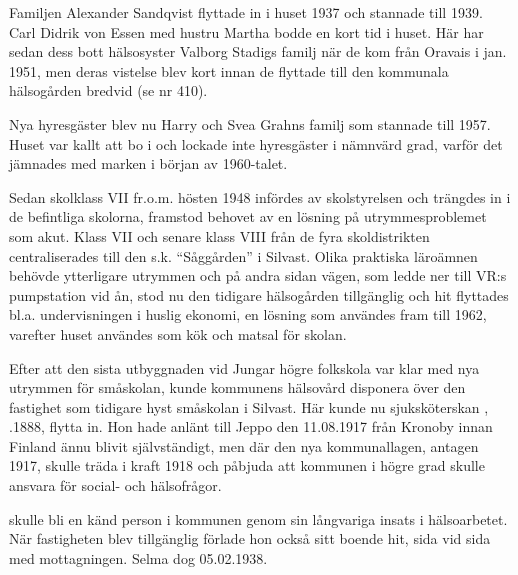 Familjen Alexander Sandqvist flyttade in i huset 1937 och stannade till 1939.  Carl Didrik von Essen med hustru Martha bodde en kort tid i huset. Här har sedan dess bott hälsosyster Valborg Stadigs familj när de kom från Oravais i jan. 1951, men deras vistelse blev kort innan de flyttade till den kommunala hälsogården bredvid (se nr 410).

Nya hyresgäster blev nu Harry och Svea Grahns familj som stannade till 1957. Huset var kallt att bo i och lockade inte hyresgäster i nämnvärd grad, varför det jämnades med marken i början av 1960-talet.



%

\jhnooccupant{}


Sedan skolklass VII fr.o.m. hösten 1948 infördes av skolstyrelsen och trängdes in i de befintliga skolorna, framstod behovet av en lösning på utrymmesproblemet som akut. Klass VII och senare klass VIII från de fyra skoldistrikten centraliserades till  den s.k. ``Såggården'' i Silvast. Olika praktiska läroämnen behövde ytterligare utrymmen och på andra sidan vägen, som ledde ner till VR:s pumpstation vid ån, stod nu den tidigare hälsogården tillgänglig och hit flyttades bl.a. undervisningen i huslig ekonomi, en lösning som användes fram till 1962, varefter huset användes som kök och matsal för skolan.

Efter att den sista utbyggnaden vid Jungar högre folkskola var klar med nya utrymmen för småskolan, kunde kommunens hälsovård disponera över den fastighet som tidigare hyst småskolan i Silvast. Här kunde nu sjuksköterskan , .1888, flytta in. Hon hade anlänt till Jeppo den 11.08.1917 från Kronoby innan Finland ännu blivit självständigt, men där den nya kommunallagen, antagen 1917, skulle träda i kraft 1918 och påbjuda att kommunen i högre grad skulle ansvara för social- och hälsofrågor.

 skulle bli en känd person i kommunen genom sin långvariga insats i hälsoarbetet. När fastigheten blev tillgänglig förlade hon också sitt boende hit, sida vid sida med mottagningen. Selma dog 05.02.1938.


